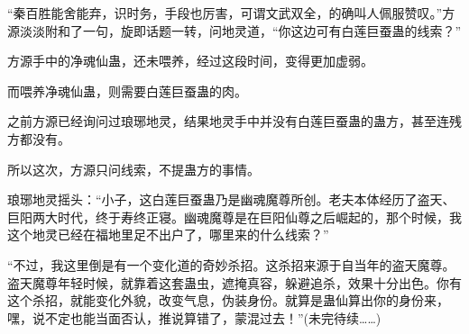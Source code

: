\begin{this_body}
“秦百胜能舍能弃，识时务，手段也厉害，可谓文武双全，的确叫人佩服赞叹。”方源淡淡附和了一句，旋即话题一转，问地灵道，“你这边可有白莲巨蚕蛊的线索？”

方源手中的净魂仙蛊，还未喂养，经过这段时间，变得更加虚弱。

而喂养净魂仙蛊，则需要白莲巨蚕蛊的肉。

之前方源已经询问过琅琊地灵，结果地灵手中并没有白莲巨蚕蛊的蛊方，甚至连残方都没有。

所以这次，方源只问线索，不提蛊方的事情。

琅琊地灵摇头：“小子，这白莲巨蚕蛊乃是幽魂魔尊所创。老夫本体经历了盗天、巨阳两大时代，终于寿终正寝。幽魂魔尊是在巨阳仙尊之后崛起的，那个时候，我这个地灵已经在福地里足不出户了，哪里来的什么线索？”

“不过，我这里倒是有一个变化道的奇妙杀招。这杀招来源于自当年的盗天魔尊。盗天魔尊年轻时候，就靠着这套蛊虫，遮掩真容，躲避追杀，效果十分出色。你有这个杀招，就能变化外貌，改变气息，伪装身份。就算是蛊仙算出你的身份来，嘿，说不定也能当面否认，推说算错了，蒙混过去！”(未完待续……)

\end{this_body}

